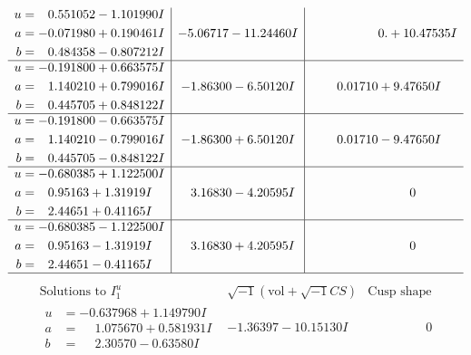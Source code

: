 \documentclass[1p]{elsarticle_modified}
\theoremstyle{definition}
\newcommand{\I}{\sqrt{-1}}
\begin{document}
$$\begin{array}{c|c|c}
\begin{aligned}
u &= \phantom{-}0.551052 - 1.101990 I \\
a &= -0.071980 + 0.190461 I \\
b &= \phantom{-}0.484358 - 0.807212 I\end{aligned}
 & -5.06717 - 11.24460 I & \phantom{-0.000000 -}0. + 10.47535 I \\ \hline\begin{aligned}
u &= -0.191800 + 0.663575 I \\
a &= \phantom{-}1.140210 + 0.799016 I \\
b &= \phantom{-}0.445705 + 0.848122 I\end{aligned}
 & -1.86300 - 6.50120 I & \phantom{-}0.01710 + 9.47650 I \\ \hline\begin{aligned}
u &= -0.191800 - 0.663575 I \\
a &= \phantom{-}1.140210 - 0.799016 I \\
b &= \phantom{-}0.445705 - 0.848122 I\end{aligned}
 & -1.86300 + 6.50120 I & \phantom{-}0.01710 - 9.47650 I \\ \hline\begin{aligned}
u &= -0.680385 + 1.122500 I \\
a &= \phantom{-}0.95163 + 1.31919 I \\
b &= \phantom{-}2.44651 + 0.41165 I\end{aligned}
 & \phantom{-}3.16830 - 4.20595 I & \phantom{-0.000000 } 0 \\ \hline\begin{aligned}
u &= -0.680385 - 1.122500 I \\
a &= \phantom{-}0.95163 - 1.31919 I \\
b &= \phantom{-}2.44651 - 0.41165 I\end{aligned}
 & \phantom{-}3.16830 + 4.20595 I & \phantom{-0.000000 } 0\\
 \hline 
 \end{array}$$\newpage$$\begin{array}{c|c|c}  
\text{Solutions to }I^u_{1}& \I (\text{vol} + \sqrt{-1}CS) & \text{Cusp shape}\\
 \hline 
\begin{aligned}
u &= -0.637968 + 1.149790 I \\
a &= \phantom{-}1.075670 + 0.581931 I \\
b &= \phantom{-}2.30570 - 0.63580 I\end{aligned}
 & -1.36397 - 10.15130 I & \phantom{-0.000000 } 0 \\ \hline\begin{aligned}

\end{aligned}
\end{array}$$
\end{document}
